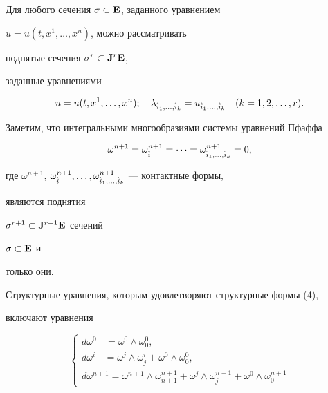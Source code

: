 \begin{notes}  


Для любого сечения $\sigma\subset\bold E$, заданного уравнением 


$u=u(t,x^1,\dotsc,x^n)$, можно рассматривать 


поднятые сечения $\sigma^r\subset\bold J^r\bold E$, 


заданные уравнениями 


$$ 


u=u(t,x^1,\dotsc,x^n);\quad 


\lambda_{\Hat i_1,\dotsc,\Hat i_k}=u_{\Hat i_1,\dotsc,\Hat i_k} 


\quad (k=1,2,\dotsc,r). 


$$ 


Заметим, что интегральными многообразиями системы уравнений Пфаффа 


$$ 


\omega^{n+1}=\omega^{n+1}_{\Hat i}=\dotsb = 


\omega^{n+1}_{\Hat i_1,\dotsc,\Hat i_k}=0, 


$$ 


где $\omega^{n+1}$, $\omega^{n+1}_{\Hat i},\dotsc, 


\omega^{n+1}_{\Hat i_1,\dotsc,\Hat i_k}$ --- контактные формы, 


являются поднятия 


$\sigma^{r+1}\subset\bold J^{r+1}\bold E$ сечений 


$\sigma\subset\bold E$ и 


только они. 


\end{notes} 


 


Структурные уравнения, которым удовлетворяют структурные формы (4), 


включают уравнения 


\begin{equation} 


\begin{cases} 


d\omega^{0\phantom{+1}}=\omega^0\wedge\omega^0_0,\\ 


d\omega^{i\phantom{+1}}=\omega^j\wedge\omega^i_j+ 


\omega^0\wedge\omega^0_0,\\ 


d\omega^{n+1}=\omega^{n+1}\wedge\omega^{n+1}_{n+1} 


+\omega^j\wedge\omega^{n+1}_j+\omega^0\wedge\omega^{n+1}_0 


\end{cases} 


\end{equation} 



